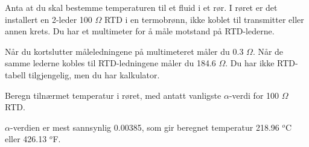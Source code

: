 

Anta at du skal bestemme temperaturen til et fluid i et rør. I røret er det installert en 2-leder 100 $\Omega$ RTD i en termobrønn, ikke koblet til transmitter eller annen krets. Du har et multimeter for å måle motstand på RTD-lederne.

Når du kortslutter måleledningene på multimeteret måler du 0.3 $\Omega$. Når de samme lederne kobles til RTD-ledningene måler du 184.6 $\Omega$. Du har ikke RTD-tabell tilgjengelig, men du har kalkulator.

Beregn tilnærmet temperatur i røret, med antatt vanligste $\alpha$-verdi for 100 $\Omega$ RTD.







$\alpha$-verdien er mest sannsynlig 0.00385, som gir beregnet temperatur 218.96 $^{o}$C eller 426.13 $^{o}$F.










